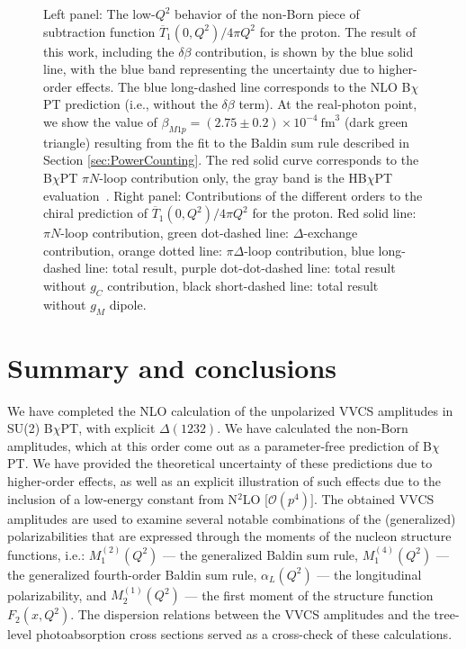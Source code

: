 \documentclass[12pt,preprint,tightenlines,
showpacs,preprintnumbers,amsmath,amssymb,
a4paper,nofootinbib]{revtex4-2}
\def\secref#1{Section \ref{sec:#1}}
\def\ol#1{\overline{#1}}
\begin{document}
\begin{figure}[bt]
\begin{center}
\caption{\small{Left panel: The low-$Q^2$ behavior of the non-Born piece of  subtraction function $ \ol{T}_1(0,Q^2)/4\pi Q^2$ for the proton. The result of this work, including the $\delta\beta$ contribution, is shown by the blue solid line, with the blue band representing the uncertainty due to higher-order effects. The blue long-dashed line corresponds to the NLO B$\chi$PT prediction (i.e., without the $\delta\beta$ term).
At the real-photon point, we show the value of $\beta_{M1p}=(2.75\pm 0.2)\times 10^{-4}~\text{fm}^3$ (dark green triangle) resulting from the fit to the Baldin sum rule described in \secref{PowerCounting}. The red solid curve corresponds to the B$\chi$PT $\pi N$-loop contribution only, the gray band is the HB$\chi$PT evaluation~\cite{Birse:2012eb}. Right panel: Contributions of the different orders to the chiral prediction of $\ol{T}_1(0,Q^2)/4\pi Q^2$ for the proton. Red solid line: $\pi N$-loop contribution, green dot-dashed line: $\Delta$-exchange contribution, orange dotted line: $\pi \Delta$-loop contribution, blue long-dashed line: total result, purple dot-dot-dashed line: total result without $g_C$ contribution, black short-dashed line: total result without $g_M$ dipole.
}
}
\label{fig:subtraction}
\end{center}
\end{figure}



\section{Summary and conclusions}\label{Sec:Summary}



We have completed the NLO calculation of the
unpolarized VVCS amplitudes in SU(2) B$\chi$PT, with explicit $\Delta(1232)$. We have calculated the non-Born amplitudes, which at this order come out as a parameter-free prediction of B$\chi$PT. We have provided the theoretical uncertainty of these predictions due to higher-order effects, as well as an explicit illustration  
of such effects due to the inclusion of a low-energy constant from N$^2$LO [$\mathcal{O}(p^4)]$. The obtained VVCS amplitudes are used to examine several notable combinations
of the (generalized) polarizabilities that are expressed through the moments of the nucleon
structure functions, i.e.: $M_1^{(2)}(Q^2)$ --- the generalized Baldin sum rule, $M_1^{(4)}(Q^2)$ ---
the generalized fourth-order Baldin sum rule, $\alpha_L(Q^2)$ --- the longitudinal polarizability,
and $M_2^{(1)}(Q^2)$ --- the first moment of the structure function $F_2(x,Q^2)$.
The dispersion relations between the VVCS amplitudes and the tree-level photoabsorption cross sections served as a cross-check of these calculations. 
\end{document}
